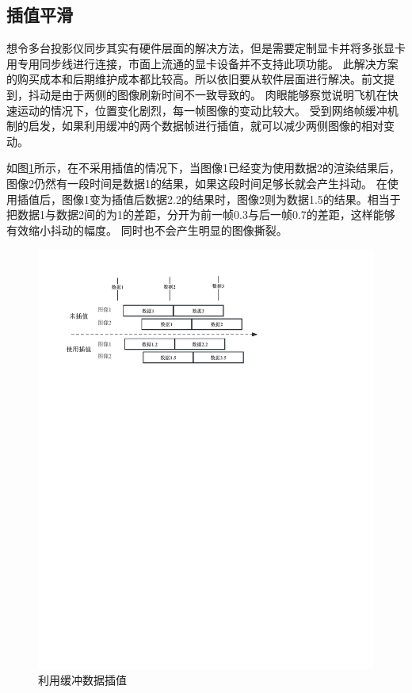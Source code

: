 \subsection{插值平滑}
想令多台投影仪同步其实有硬件层面的解决方法，但是需要定制显卡并将多张显卡用专用同步线进行连接，市面上流通的显卡设备并不支持此项功能。
此解决方案的购买成本和后期维护成本都比较高。所以依旧要从软件层面进行解决。前文提到，抖动是由于两侧的图像刷新时间不一致导致的。
肉眼能够察觉说明飞机在快速运动的情况下，位置变化剧烈，每一帧图像的变动比较大。
受到网络帧缓冲机制的启发，如果利用缓冲的两个数据帧进行插值，就可以减少两侧图像的相对变动。
\par 
如图\ref{lerp}所示，在不采用插值的情况下，当图像1已经变为使用数据2的渲染结果后，图像2仍然有一段时间是数据1的结果，如果这段时间足够长就会产生抖动。
在使用插值后，图像1变为插值后数据2.2的结果时，图像2则为数据1.5的结果。相当于把数据1与数据2间的为1的差距，分开为前一帧0.3与后一帧0.7的差距，这样能够有效缩小抖动的幅度。
同时也不会产生明显的图像撕裂。
\begin{figure}[h!]
    \begin{center}
        \includegraphics[width=\textwidth]{pictures/lerp.pdf}
        \caption{利用缓冲数据插值}
        \label{lerp}
    \end{center}
\end{figure}
